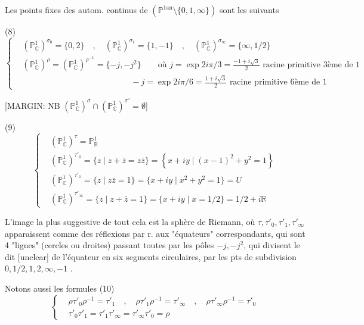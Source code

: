 Les points fixes des autom. continus de $(\mathbb{P}^{1 \text{an}} \setminus \{0,1,\infty\})$
sont les suivants

(8) $$
\left\{
\begin{aligned}
& (\mathbb{P}^1_\mathbb{C})^{\sigma_0} = \{0, 2\} \quad , \quad (\mathbb{P}^1_\mathbb{C})^{\sigma_1} = \{1, -1\} \quad , \quad (\mathbb{P}^1_\mathbb{C})^{\sigma_\infty} = \{\infty, 1/2\} \\
& (\mathbb{P}^1_\mathbb{C})^\rho = (\mathbb{P}^1_\mathbb{C})^{\rho^{-1}} = \{-j, -j^2\} \qquad \text{où } j = \exp 2i\pi/3 = \frac{-1+i\sqrt{3}}{2} \text{ racine primitive 3ème de 1} \\
& \qquad \qquad \qquad \qquad \qquad \qquad \quad -j = \exp 2i\pi/6 = \frac{1+i\sqrt{3}}{2} \text{ racine primitive 6ème de 1}
\end{aligned}
\right.
$$

[MARGIN: NB $(\mathbb{P}^1_\mathbb{C})^\sigma \cap (\mathbb{P}^1_\mathbb{C})^{\sigma'} = \emptyset$]

(9) $$
\left\{
\begin{aligned}
& (\mathbb{P}^1_\mathbb{C})^{\tau} = \mathbb{P}^1_\mathbb{R} \\
& (\mathbb{P}^1_\mathbb{C})^{\tau'_0} = \{ z \mid z + \bar{z} = z \bar{z} \} = \left\{ x+iy \mid (x-1)^2 + y^2 = 1 \right\} \\
& (\mathbb{P}^1_\mathbb{C})^{\tau'_1} = \{ z \mid z \bar{z} = 1 \} = \{ x+iy \mid x^2+y^2=1 \} = U \\
& (\mathbb{P}^1_\mathbb{C})^{\tau'_\infty} = \{ z \mid z + \bar{z} = 1 \} = \{ x+iy \mid x = 1/2 \} = 1/2 + i\mathbb{R}
\end{aligned}
\right.
$$

L'image la plus suggestive de tout cela est la
sphère de Riemann, où $\tau, \tau'_0, \tau'_1, \tau'_\infty$ apparaissent comme
des réflexions par r. aux "équateurs" correspondants, qui
sont 4 "lignes" (cercles ou droites)
passant toutes par les pôles $-j, -j^2$, qui
divisent le dit [unclear] de l'équateur en six
segments circulaires, par les pts de
subdivision $0, 1/2, 1, 2, \infty, -1$ .

Notons aussi les formules
(10) $$
\left\{
\begin{aligned}
& \rho \tau'_0 \rho^{-1} = \tau'_1 \quad , \quad \rho \tau'_1 \rho^{-1} = \tau'_\infty \quad , \quad \rho \tau'_\infty \rho^{-1} = \tau'_0 \\
& \tau'_0 \tau'_1 = \tau'_1 \tau'_\infty = \tau'_\infty \tau'_0 = \rho
\end{aligned}
\right.
$$

